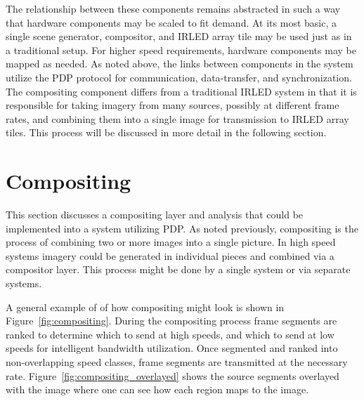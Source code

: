     The relationship between these components remains abstracted in such a way that hardware components may be scaled to fit demand. At its most basic, a single scene generator, compositor, and IRLED array tile may be used just as in a traditional setup. For higher speed requirements, hardware components may be mapped as needed. As noted above, the links between components in the system utilize the PDP protocol for communication, data-transfer, and synchronization. The compositing component differs from a traditional IRLED system in that it is responsible for taking imagery from many sources, possibly at different frame rates, and combining them into a single image for transmission to IRLED array tiles. This process will be discussed in more detail in the following section.

\section{Compositing}
    \label{sec:compositing}
    This section discusses a compositing layer and analysis that could be implemented into a system utilizing PDP. As noted previously, compositing is the process of combining two or more images into a single picture. In high speed systems imagery could be generated in individual pieces and combined via a compositor layer. This process might be done by a single system or via separate systems.

    A general example of of how compositing might look is shown in Figure~\ref{fig:compositing}. During the compositing process frame segments are ranked to determine which to send at high speeds, and which to send at low speeds for intelligent bandwidth utilization. Once segmented and ranked into non-overlapping speed classes, frame segments are transmitted at the necessary rate. Figure~\ref{fig:compositing_overlayed} shows the source segments overlayed with the image where one can see how each region maps to the image.

